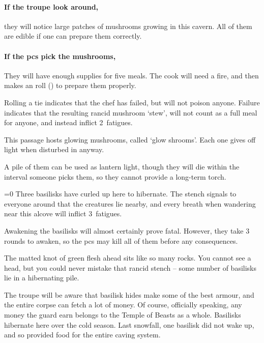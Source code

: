 \begin{multicols}{2}
\paragraph{If the troupe look around,}
they will notice large patches of mushrooms growing in this cavern.
All of them are edible if one can prepare them correctly.

\paragraph{If the \glspl{pc} pick the mushrooms,}
They will have enough supplies for five meals.
The cook will need a fire,%
and then makes an  roll (\tn[10]) to prepare them properly.

Rolling a tie indicates that the chef has failed, but will not poison anyone.
Failure indicates that the resulting rancid mushroom `stew', will not count as a full meal for anyone, and instead inflict 2~\glspl{fatigue}.


This passage hosts glowing mushrooms, called `glow shrooms'.%
Each one gives off light when disturbed in anyway.

A pile of them can be used as lantern light, though they will die within the \gls{interval} someone picks them, so they cannot provide a long-term torch.


\ifnum\value{temperature}=0
  Three basilisks have curled up here to hibernate.
  The stench signals to everyone around that the creatures lie nearby, and every breath when wandering near this alcove will inflict 3~\glspl{fatigue}.

  Awakening the basilisks will almost certainly prove fatal.
  However, they take 3 rounds to awaken, so the \glspl{pc} may kill all of them before any consequences.

  \begin{boxtext}
    The matted knot of green flesh ahead sits like so many rocks.
    You cannot see a head, but you could never mistake that rancid stench -- some number of basilisks lie in a hibernating pile.
  \end{boxtext}


  The troupe will be aware that basilisk hides make some of the best armour, and the entire corpse can fetch a lot of money.
  Of course, officially speaking, any money the \gls{guard} earn belongs to the Temple of Beasts as a whole.%
\else
  Basilisks hibernate here over the cold season.
  Last snowfall, one basilisk did not wake up, and so provided food for the entire caving system.


\end{multicols}
